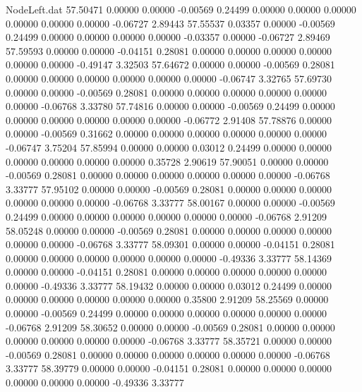 \begin{filecontents}{NodeLeft.dat}
  57.50471    0.00000    0.00000    -0.00569    0.24499    0.00000    0.00000    0.00000    0.00000    0.00000    0.00000   -0.06727    2.89443
  57.55537    0.03357    0.00000    -0.00569    0.24499    0.00000    0.00000    0.00000    0.00000   -0.03357    0.00000   -0.06727    2.89469
  57.59593    0.00000    0.00000    -0.04151    0.28081    0.00000    0.00000    0.00000    0.00000    0.00000    0.00000   -0.49147    3.32503
  57.64672    0.00000    0.00000    -0.00569    0.28081    0.00000    0.00000    0.00000    0.00000    0.00000    0.00000   -0.06747    3.32765
  57.69730    0.00000    0.00000    -0.00569    0.28081    0.00000    0.00000    0.00000    0.00000    0.00000    0.00000   -0.06768    3.33780
  57.74816    0.00000    0.00000    -0.00569    0.24499    0.00000    0.00000    0.00000    0.00000    0.00000    0.00000   -0.06772    2.91408
  57.78876    0.00000    0.00000    -0.00569    0.31662    0.00000    0.00000    0.00000    0.00000    0.00000    0.00000   -0.06747    3.75204
  57.85994    0.00000    0.00000     0.03012    0.24499    0.00000    0.00000    0.00000    0.00000    0.00000    0.00000    0.35728    2.90619
  57.90051    0.00000    0.00000    -0.00569    0.28081    0.00000    0.00000    0.00000    0.00000    0.00000    0.00000   -0.06768    3.33777
  57.95102    0.00000    0.00000    -0.00569    0.28081    0.00000    0.00000    0.00000    0.00000    0.00000    0.00000   -0.06768    3.33777
  58.00167    0.00000    0.00000    -0.00569    0.24499    0.00000    0.00000    0.00000    0.00000    0.00000    0.00000   -0.06768    2.91209
  58.05248    0.00000    0.00000    -0.00569    0.28081    0.00000    0.00000    0.00000    0.00000    0.00000    0.00000   -0.06768    3.33777
  58.09301    0.00000    0.00000    -0.04151    0.28081    0.00000    0.00000    0.00000    0.00000    0.00000    0.00000   -0.49336    3.33777
  58.14369    0.00000    0.00000    -0.04151    0.28081    0.00000    0.00000    0.00000    0.00000    0.00000    0.00000   -0.49336    3.33777
  58.19432    0.00000    0.00000     0.03012    0.24499    0.00000    0.00000    0.00000    0.00000    0.00000    0.00000    0.35800    2.91209
  58.25569    0.00000    0.00000    -0.00569    0.24499    0.00000    0.00000    0.00000    0.00000    0.00000    0.00000   -0.06768    2.91209
  58.30652    0.00000    0.00000    -0.00569    0.28081    0.00000    0.00000    0.00000    0.00000    0.00000    0.00000   -0.06768    3.33777
  58.35721    0.00000    0.00000    -0.00569    0.28081    0.00000    0.00000    0.00000    0.00000    0.00000    0.00000   -0.06768    3.33777
  58.39779    0.00000    0.00000    -0.04151    0.28081    0.00000    0.00000    0.00000    0.00000    0.00000    0.00000   -0.49336    3.33777

\end{filecontents}

